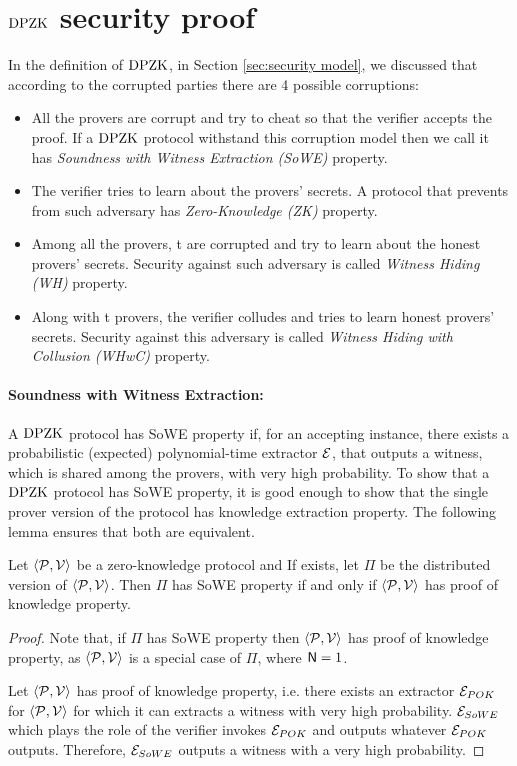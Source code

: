 \section{$\text{DPZK}$ security proof}\label{sec:security}
In the definition of $\text{DPZK}$, in Section \ref{sec:security model}, we discussed that according to the corrupted parties there are 4 possible corruptions:
\begin{itemize}
	\item All the provers are corrupt and try to cheat so that the verifier accepts the proof. If a $\text{DPZK}$ protocol withstand this corruption model then we call it has {\em Soundness with Witness Extraction (SoWE)} property.
	\item The verifier tries to learn about the provers' secrets. A protocol that prevents from such adversary has {\em Zero-Knowledge (ZK)} property.
	\item Among all the provers, t are corrupted and try to learn about the honest provers' secrets. Security against such adversary is called {\em Witness Hiding (WH)} property.
	\item Along with t provers, the verifier colludes and tries to learn honest provers' secrets. Security against this adversary is called {\em Witness Hiding with Collusion (WHwC)} property.
\end{itemize}
\paragraph{Soundness with Witness Extraction:}A $\text{DPZK}$ protocol has {SoWE} property if, for an accepting instance, there exists a probabilistic (expected) polynomial-time extractor $\mathcal{E}$, that outputs a witness, which is shared among the provers, with very high probability.
To show that a $\text{DPZK}$ protocol has {SoWE} property, it is good enough to show that the single prover version of the protocol has knowledge extraction property. The following lemma ensures that both are equivalent.

\begin{lemma}\label{lem:SoWE}
	Let $\langle \mathcal{P},\mathcal{V}\rangle$ be a zero-knowledge protocol and If exists, let $\Pi$ be the distributed version of $\langle \mathcal{P},\mathcal{V}\rangle$. Then $\Pi$ has SoWE property if and only if $\langle \mathcal{P},\mathcal{V}\rangle$ has proof of knowledge property.
\end{lemma} 

\begin{proof}
	Note that, if $\Pi$ has SoWE property then $\langle \mathcal{P},\mathcal{V}\rangle$ has proof of knowledge property, as $\langle \mathcal{P},\mathcal{V}\rangle$ is a special case of $\Pi$, where $\mathsf{N}=1$.
	
	Let $\langle \mathcal{P},\mathcal{V}\rangle$ has proof of knowledge property, i.e. there exists an extractor $\mathcal{E}_{POK}$ for $\langle \mathcal{P},\mathcal{V}\rangle$ for which it can extracts a witness with very high probability. $\mathcal{E}_{SoWE}$ which plays the role of the verifier invokes $\mathcal{E}_{POK}$ and outputs whatever $\mathcal{E}_{POK}$ outputs. Therefore, $\mathcal{E}_{SoWE}$ outputs a witness with a very high probability.
\end{proof}

